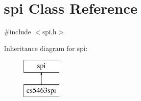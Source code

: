 \hypertarget{classspi}{\section{spi Class Reference}
\label{classspi}
}


{\ttfamily \#include $<$spi.\-h$>$}

Inheritance diagram for spi\-:\begin{figure}[H]
\begin{center}
\leavevmode
\includegraphics[height=2.000000cm]{classspi}
\end{center}
\end{figure}
